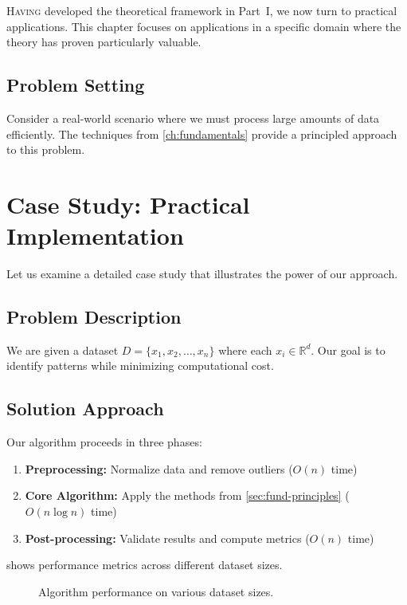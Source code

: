 \documentclass[11pt,twoside,openright]{book}
\theoremstyle{plain}
\theoremstyle{definition}
\theoremstyle{remark}
\newcommand{\R}{\mathbb{R}}
\begin{document}
\lettrine{H}{aving} developed the theoretical framework in Part~I, we now turn to practical applications. This chapter focuses on applications in a specific domain where the theory has proven particularly valuable.

\subsection{Problem Setting}

Consider a real-world scenario where we must process large amounts of data efficiently. The techniques from \cref{ch:fundamentals} provide a principled approach to this problem.

\section{Case Study: Practical Implementation}
\label{sec:app1-case}

Let us examine a detailed case study that illustrates the power of our approach.

\subsection{Problem Description}

We are given a dataset $D = \{x_1, x_2, \ldots, x_n\}$ where each $x_i \in \R^d$. Our goal is to identify patterns while minimizing computational cost.

\subsection{Solution Approach}

Our algorithm proceeds in three phases:

\begin{enumerate}[itemsep=0.3em]
    \item \textbf{Preprocessing:} Normalize data and remove outliers ($O(n)$ time)
    \item \textbf{Core Algorithm:} Apply the methods from \cref{sec:fund-principles} ($O(n \log n)$ time)
    \item \textbf{Post-processing:} Validate results and compute metrics ($O(n)$ time)
\end{enumerate}

 shows performance metrics across different dataset sizes.

\begin{figure}[tbp]
    \centering
    \caption{Algorithm performance on various dataset sizes.}
    \label{fig:algorithm-performance}
\end{figure}
\end{document}
